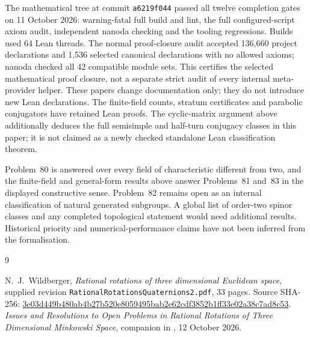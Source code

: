 \documentclass[11pt]{article}
\theoremstyle{remark}
\begin{document}
The mathematical tree at commit \texttt{a6219f044} passed all twelve
completion gates on 11 October 2026: warning-fatal full build and lint,
the full configured-script axiom audit, independent nanoda checking and the
tooling regressions. Builds used 64 Lean threads. The normal proof-closure
audit accepted 136,660 project declarations and 1,536 selected canonical
declarations with no allowed axioms; nanoda checked all 42 compatible
module sets. This certifies the selected mathematical proof closure, not a
separate strict audit of every internal meta-provider helper. These papers
change documentation only; they do not introduce new Lean declarations.
The finite-field counts, stratum certificates and parabolic conjugators
have retained Lean proofs. The cyclic-matrix argument above additionally
deduces the full semisimple and half-turn conjugacy classes in this paper;
it is not claimed as a newly checked standalone Lean classification theorem.

Problem~80 is answered over every field of characteristic different from
two, and the finite-field
and general-form results above answer Problems~81 and~83 in the displayed
constructive sense. Problem~82 remains open as an internal classification of
natural generated subgroups. A global list of order-two spinor classes and
any completed topological statement would need additional results. Historical
priority and numerical-performance claims have not been inferred from the
formalisation.

\begin{thebibliography}{9}
\raggedright
{} N.~J.~Wildberger,
\emph{Rational rotations of three dimensional Euclidean space}, supplied
revision \texttt{RationalRotationsQuaternions2.pdf}, 33 pages.
Source SHA-256:
\url{3e03d449b480ab4b27b520e8059495bab2e62cdf3852b1ff33e02a38c7ad8c53}.
 \emph{Issues and Resolutions to Open Problems in Rational
Rotations of Three Dimensional Minkowski Space}, companion in
,
12 October 2026.
\end{thebibliography}
\end{document}
